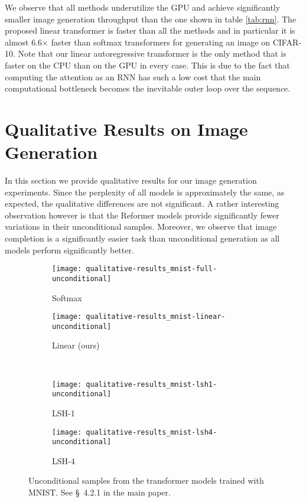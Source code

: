\documentclass{article}
\begin{document}
We observe that all methods underutilize the GPU and achieve significantly
smaller image generation throughput than the one shown in table \ref{tab:rnn}.
The proposed linear transformer is faster than all the methods and in
particular it is almost 6.6$\times$ faster than softmax transformers for
generating an image on CIFAR-10. Note that our linear autoregressive
transformer is the only method that is faster on the CPU than on the GPU in
every case. This is due to the fact that computing the attention as an RNN has
such a low cost that the main computational bottleneck becomes the inevitable
outer loop over the sequence.

\section{Qualitative Results on Image Generation}

In this section we provide qualitative results for our image generation
experiments. Since the perplexity of all models is approximately the same, as
expected, the qualitative differences are not significant. A rather interesting
observation however is that the Reformer models provide significantly fewer
variations in their unconditional samples. Moreover, we observe that image
completion is a significantly easier task than unconditional generation as all
models perform significantly better.

\begin{figure*}[h]
    \centering
    \begin{subfigure}[t]{0.4\columnwidth}
        \texttt{[image: qualitative-results\_mnist-full-unconditional]}
        \caption{Softmax}
    \end{subfigure}
    \quad
    \begin{subfigure}[t]{0.4\columnwidth}
        \texttt{[image: qualitative-results\_mnist-linear-unconditional]}
        \caption{Linear (ours)}
    \end{subfigure}\\[1em]
    \begin{subfigure}[t]{0.4\columnwidth}
        \texttt{[image: qualitative-results\_mnist-lsh1-unconditional]}
        \caption{LSH-1}
    \end{subfigure}
    \quad
    \begin{subfigure}[t]{0.4\columnwidth}
        \texttt{[image: qualitative-results\_mnist-lsh4-unconditional]}
        \caption{LSH-4}
    \end{subfigure}
    \caption{Unconditional samples from the transformer models trained with
             MNIST. See \S~{4.2.1} in the main paper.}
    \label{fig:cifar_unconditional}
\end{figure*}
\end{document}
